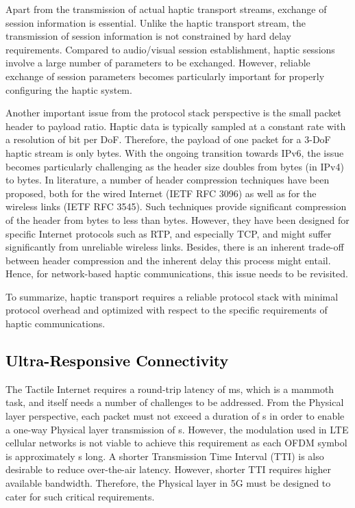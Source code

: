 \documentclass[journal]{IEEEtran}
\begin{document}
Apart from the transmission of actual haptic transport streams, exchange of session information is essential. Unlike the haptic transport stream, the transmission of session information is not constrained by hard delay requirements. Compared to audio/visual session establishment, haptic sessions involve a large number of parameters to be exchanged. However, reliable exchange of session parameters becomes particularly important for properly configuring the haptic system.

Another important issue from the protocol stack perspective is the small packet header to payload ratio. Haptic data is typically sampled at a constant rate with a resolution of  bit per DoF. Therefore, the payload of one packet for a 3-DoF haptic stream is only  bytes. With the ongoing transition towards IPv6, the issue becomes particularly challenging as the header size doubles from  bytes (in IPv4) to  bytes. In literature, a number of header compression techniques have been proposed, both for the wired Internet (IETF RFC 3096)  as well as for the wireless links (IETF RFC 3545). Such techniques provide significant compression of the header from  bytes to less than  bytes.  However, they have been designed for  specific Internet protocols such as RTP, and especially TCP, and might suffer significantly from unreliable wireless links. Besides, there is an inherent trade-off between header compression and the inherent delay this process might entail. Hence, for network-based haptic communications, this issue needs to be revisited.










To summarize, haptic transport requires a reliable protocol stack with minimal protocol overhead and optimized with respect to the specific requirements of haptic communications.






















\subsection{\textcolor{black}{Ultra-Responsive Connectivity}}
The Tactile Internet requires a round-trip latency of  ms, which is a mammoth task, and itself needs a number of challenges to be addressed. From the Physical layer perspective, each packet must not exceed a duration of  s \cite{5G-GF} in order to enable a one-way Physical layer transmission of  s. However, the modulation used in LTE cellular networks is not viable to achieve this requirement as each OFDM symbol is approximately  s long. A shorter Transmission Time Interval (TTI) is also desirable to reduce over-the-air latency. However, shorter TTI requires higher available bandwidth. Therefore, the Physical layer in 5G must be designed to cater for such critical requirements.
\end{document}
